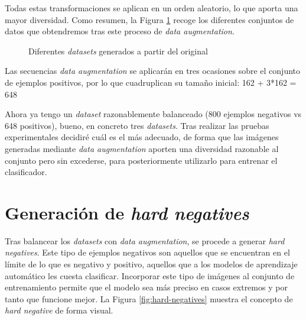 Todas estas transformaciones se aplican en un orden aleatorio, lo que aporta una mayor diversidad. Como resumen, la Figura \ref{fig:datasets} recoge los diferentes conjuntos de datos que obtendremos tras este proceso de \textit{data augmentation}.
\begin{figure}[H]
\centering
    \caption{Diferentes \textit{datasets} generados a partir del original}
    \label{fig:datasets}
\end{figure}

Las secuencias \textit{data augmentation} se aplicarán en tres ocasiones sobre el conjunto de ejemplos positivos, por lo que cuadruplican su tamaño inicial: 162 + 3*162 = 648

Ahora ya tengo un \textit{dataset} razonablemente balanceado (800 ejemplos negativos vs 648 positivos), bueno, en concreto tres \textit{datasets}. Tras realizar las pruebas experimentales decidiré cuál es el más adecuado, de forma que las imágenes generadas mediante \textit{data augmentation} aporten una diversidad razonable al conjunto pero sin excederse, para posteriormente utilizarlo para entrenar el clasificador.

\newpage
\section{Generación de \textit{hard negatives}}
Tras balancear los \textit{datasets} con \textit{data augmentation}, se procede a generar \textit{hard negatives}. Este tipo de ejemplos negativos son aquellos que se encuentran en el límite de lo que es negativo y positivo, aquellos que a los modelos de aprendizaje automático les cuesta clasificar. Incorporar este tipo de imágenes al conjunto de entrenamiento permite que el modelo sea más preciso en casos extremos y por tanto que funcione mejor. La Figura \ref{fig:hard-negatives} muestra el concepto de \textit{hard negative} de forma visual.

